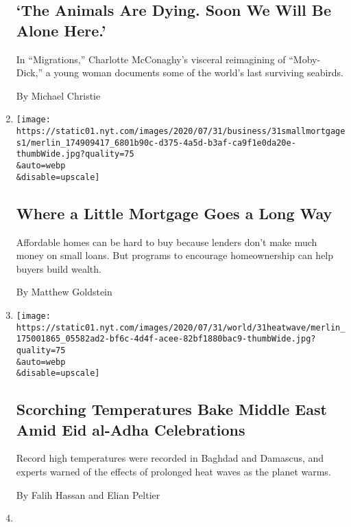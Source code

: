 \begin{enumerate}
{  \subsection{`The Animals Are Dying. Soon We Will Be Alone
  Here.'}\label{the-animals-are-dying-soon-we-will-be-alone-here}}

  In ``Migrations,'' Charlotte McConaghy's visceral reimagining of
  ``Moby-Dick,'' a young woman documents some of the world's last
  surviving seabirds.

  By Michael Christie
\item
  \href{/2020/08/02/business/mortgages-affordable-housing.html}{}

  \texttt{[image: https://static01.nyt.com/images/2020/07/31/business/31smallmortgages1/merlin\_174909417\_6801b90c-d375-4a5d-b3af-ca9f1e0da20e-thumbWide.jpg?quality=75\\\&auto=webp\\\&disable=upscale]}

  \hypertarget{where-a-little-mortgage-goes-a-long-way}{%
  \subsection{Where a Little Mortgage Goes a Long
  Way}\label{where-a-little-mortgage-goes-a-long-way}}

  Affordable homes can be hard to buy because lenders don't make much
  money on small loans. But programs to encourage homeownership can help
  buyers build wealth.

  By Matthew Goldstein
\item
  \href{/2020/07/31/world/middleeast/Middle-East-heat-wave.html}{}

  \texttt{[image: https://static01.nyt.com/images/2020/07/31/world/31heatwave/merlin\_175001865\_05582ad2-bf6c-4d4f-acee-82bf1880bac9-thumbWide.jpg?quality=75\\\&auto=webp\\\&disable=upscale]}

  \hypertarget{scorching-temperatures-bake-middle-east-amid-eid-al-adha-celebrations}{%
  \subsection{Scorching Temperatures Bake Middle East Amid Eid al-Adha
  Celebrations}\label{scorching-temperatures-bake-middle-east-amid-eid-al-adha-celebrations}}

  Record high temperatures were recorded in Baghdad and Damascus, and
  experts warned of the effects of prolonged heat waves as the planet
  warms.

  By Falih Hassan and Elian Peltier
\item
  \href{/2020/07/29/climate/skating-hockey-climate-change.html}{}


\end{enumerate}
